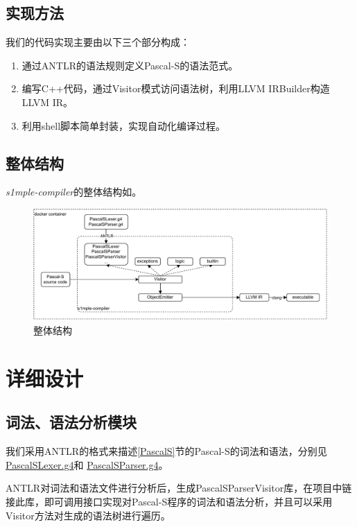 \documentclass[lang=cn,11pt,a4paper,cite=authornum]{paper}
\begin{document}
\subsection{实现方法}

我们的代码实现主要由以下三个部分构成：

\begin{enumerate}
    \item 通过ANTLR的语法规则定义Pascal-S的语法范式。
    \item 编写C++代码，通过Visitor模式访问语法树，利用LLVM IRBuilder构造LLVM IR。
    \item 利用shell脚本简单封装，实现自动化编译过程。
\end{enumerate}

\subsection{整体结构}

\emph{s1mple-compiler}的整体结构如。

\begin{figure}[htbp]
    \centering
    \includegraphics[width=\linewidth]{./Images/overview.pdf}
    \caption{整体结构\label{fig:overview}}
\end{figure}

\section{详细设计}

\subsection{词法、语法分析模块}

我们采用ANTLR的格式来描述\ref{PascalS}节的Pascal-S的词法和语法，分别见\href{run:../src/PascalSLexer.g4}{PascalSLexer.g4}和 \href{run:../src/PascalSParser.g4}{PascalSParser.g4}。

ANTLR对词法和语法文件进行分析后，生成PascalSParserVisitor库，在项目中链接此库，即可调用接口实现对Pascal-S程序的词法和语法分析，并且可以采用Visitor方法对生成的语法树进行遍历。
\end{document}
